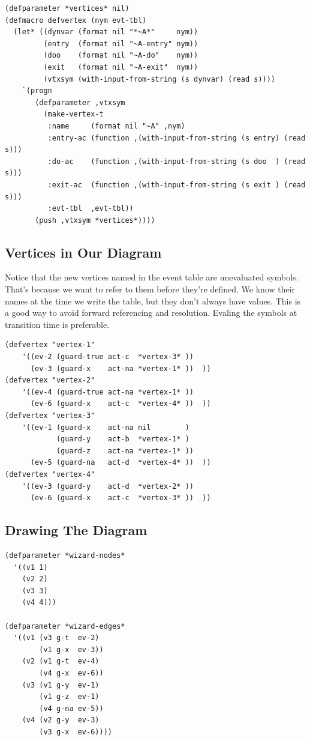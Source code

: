 \documentclass[10pt,oneside,x11names]{article}
\begin{document}
\begin{verbatim}
(defparameter *vertices* nil)
(defmacro defvertex (nym evt-tbl)
  (let* ((dynvar (format nil "*~A*"     nym))
         (entry  (format nil "~A-entry" nym))
         (doo    (format nil "~A-do"    nym))
         (exit   (format nil "~A-exit"  nym))
         (vtxsym (with-input-from-string (s dynvar) (read s))))
    `(progn
       (defparameter ,vtxsym
         (make-vertex-t
          :name     (format nil "~A" ,nym)
          :entry-ac (function ,(with-input-from-string (s entry) (read s)))
          :do-ac    (function ,(with-input-from-string (s doo  ) (read s)))
          :exit-ac  (function ,(with-input-from-string (s exit ) (read s)))
          :evt-tbl  ,evt-tbl))
       (push ,vtxsym *vertices*))))
\end{verbatim}

\subsection{Vertices in Our Diagram}
\label{sec:org20d1c6e}

Notice that the new vertices named in the event table are unevaluated symbols.
That's because we want to refer to them before they're defined. We know their
names at the time we write the table, but they don't always have values. This
is a good way to avoid forward referencing and resolution. Evaling the symbols
at transition time is preferable.

\begin{verbatim}
(defvertex "vertex-1"
    '((ev-2 (guard-true act-c  *vertex-3* ))
      (ev-3 (guard-x    act-na *vertex-1* ))  ))
(defvertex "vertex-2"
    '((ev-4 (guard-true act-na *vertex-1* ))
      (ev-6 (guard-x    act-c  *vertex-4* ))  ))
(defvertex "vertex-3"
    '((ev-1 (guard-x    act-na nil        )
            (guard-y    act-b  *vertex-1* )
            (guard-z    act-na *vertex-1* ))
      (ev-5 (guard-na   act-d  *vertex-4* ))  ))
(defvertex "vertex-4"
    '((ev-3 (guard-y    act-d  *vertex-2* ))
      (ev-6 (guard-x    act-c  *vertex-3* ))  ))
\end{verbatim}

\subsection{Drawing The Diagram}
\label{sec:orga0fe88d}

\begin{verbatim}
(defparameter *wizard-nodes*
  '((v1 1)
    (v2 2)
    (v3 3)
    (v4 4)))

(defparameter *wizard-edges*
  '((v1 (v3 g-t  ev-2)
        (v1 g-x  ev-3))
    (v2 (v1 g-t  ev-4)
        (v4 g-x  ev-6))
    (v3 (v1 g-y  ev-1)
        (v1 g-z  ev-1)
        (v4 g-na ev-5))
    (v4 (v2 g-y  ev-3)
        (v3 g-x  ev-6))))
\end{verbatim}
\end{document}

